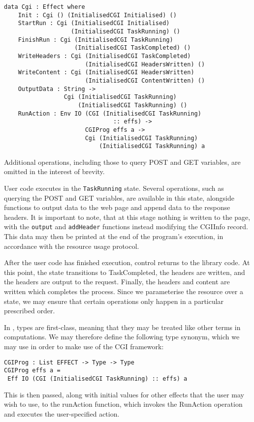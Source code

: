 \documentclass[preprint]{sigplanconf}
\begin{document}
{\small
\begin{verbatim}
data Cgi : Effect where
    Init : Cgi () (InitialisedCGI Initialised) ()
    StartRun : Cgi (InitialisedCGI Initialised) 
                   (InitialisedCGI TaskRunning) ()
    FinishRun : Cgi (InitialisedCGI TaskRunning) 
                    (InitialisedCGI TaskCompleted) ()
    WriteHeaders : Cgi (InitialisedCGI TaskCompleted) 
                       (InitialisedCGI HeadersWritten) ()
    WriteContent : Cgi (InitialisedCGI HeadersWritten) 
                       (InitialisedCGI ContentWritten) ()
    OutputData : String -> 
                 Cgi (InitialisedCGI TaskRunning) 
                     (InitialisedCGI TaskRunning) ()
    RunAction : Env IO (CGI (InitialisedCGI TaskRunning) 
                               :: effs) -> 
                       CGIProg effs a -> 
                       Cgi (InitialisedCGI TaskRunning) 
                           (InitialisedCGI TaskRunning) a
\end{verbatim}
}
Additional operations, including those to query POST and GET variables, are omitted in the interest of brevity.

User code executes in the \texttt{TaskRunning} state. Several operations, such as querying the POST and GET variables, are available in this state, alongside functions to output data to the web page and append data to the response headers. It is important to note, that at this stage nothing is written to the page, with the \texttt{output} and \texttt{addHeader} functions instead modifying the CGIInfo record. This data may then be printed at the end of the program's execution, in accordance with the resource usage protocol.

After the user code has finished execution, control returns to the library code. At this point, the state transitions to TaskCompleted, the headers are written, and the headers are output to the request. Finally, the headers and content are written which completes the process. Since we parameterise the resource over a state, we may ensure that certain operations only happen in a particular prescribed order.

In \idris{}, types are first-class, meaning that they may be treated like other terms in computations. We may therefore define the following type synonym, which we may use in order to make use of the CGI framework: 
{\small
\begin{verbatim}
CGIProg : List EFFECT -> Type -> Type
CGIProg effs a = 
 Eff IO (CGI (InitialisedCGI TaskRunning) :: effs) a
\end{verbatim}
}
This is then passed, along with initial values for other effects that the user may wish to use, to the runAction function, which invokes the RunAction operation and executes the user-specified action.
\end{document}
